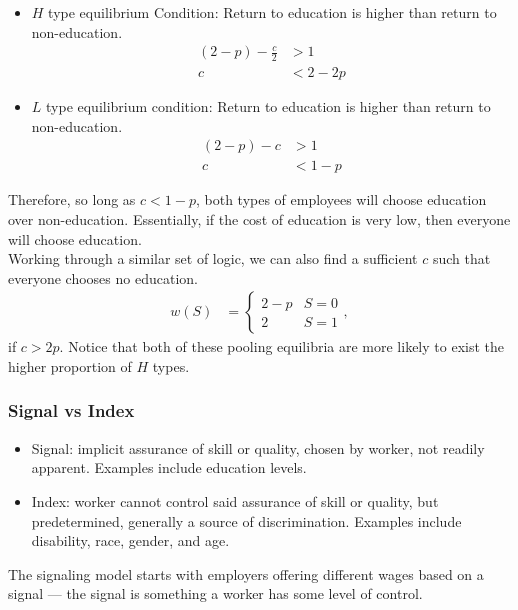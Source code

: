 \documentclass[10pt]{extarticle}
\begin{document}
\begin{description}
\begin{itemize}
        \item $H$ type equilibrium Condition: Return to education is higher than return to non-education.
          \begin{align*}
            (2-p)-\frac{c}{2} &> 1\\
            c &< 2-2p
          \end{align*}
        \item $L$ type equilibrium condition: Return to education is higher than return to non-education.
          \begin{align*}
            (2-p)-c &> 1\\
            c &< 1-p
          \end{align*}
      \end{itemize}
      Therefore, so long as $c < 1-p$, both types of employees will choose education over non-education. Essentially, if the cost of education is very low, then everyone will choose education.\\

      Working through a similar set of logic, we can also find a sufficient $c$ such that everyone chooses no education.
      \begin{align*}
        w(S) &= \begin{cases}
          2-p & S=0\\
          2 & S=1
        \end{cases},
      \end{align*}
       if $c > 2p $. Notice that both of these pooling equilibria are more likely to exist the higher proportion of $H$ types.
  \end{description}
  \subsubsection{Signal vs Index}%
  \begin{itemize}
    \item Signal: implicit assurance of skill or quality, chosen by worker, not readily apparent. Examples include education levels.
    \item Index: worker cannot control said assurance of skill or quality, but predetermined, generally a source of discrimination. Examples include disability, race, gender, and age.
  \end{itemize}
  The signaling model starts with employers offering different wages based on a signal --- the signal is something a worker has some level of control.\\
\end{document}
